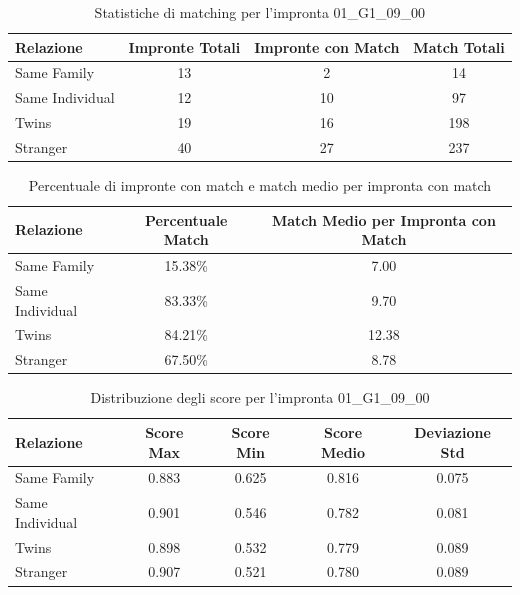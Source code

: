 \begin{table}[htbp]
\centering
\caption{Statistiche di matching per l'impronta 01\_G1\_09\_00}
\label{tab:results_01_G1_09_00}
\begin{tabular}{|l|c|c|c|}
\hline
\textbf{Relazione} & \textbf{Impronte Totali} & \textbf{Impronte con Match} & \textbf{Match Totali} \\
\hline
Same Family & 13 & 2 & 14 \\
\hline
Same Individual & 12 & 10 & 97 \\
\hline
Twins & 19 & 16 & 198 \\
\hline
Stranger & 40 & 27 & 237 \\
\hline
\end{tabular}
\end{table}


\begin{table}[htbp]
\centering
\caption{Percentuale di impronte con match e match medio per impronta con match}
\label{tab:match_percentage_01_G1_09_00}
\begin{tabular}{|l|c|c|}
\hline
\textbf{Relazione} & \textbf{Percentuale Match} & \textbf{Match Medio per Impronta con Match} \\
\hline
Same Family & 15.38\% & 7.00 \\
\hline
Same Individual & 83.33\% & 9.70 \\
\hline
Twins & 84.21\% & 12.38 \\
\hline
Stranger & 67.50\% & 8.78 \\
\hline
\end{tabular}
\end{table}


\begin{table}[htbp]
\centering
\caption{Distribuzione degli score per l'impronta 01\_G1\_09\_00}
\label{tab:scores_01_G1_09_00}
\begin{tabular}{|l|c|c|c|c|}
\hline
\textbf{Relazione} & \textbf{Score Max} & \textbf{Score Min} & \textbf{Score Medio} & \textbf{Deviazione Std} \\
\hline
Same Family & 0.883 & 0.625 & 0.816 & 0.075 \\
\hline
Same Individual & 0.901 & 0.546 & 0.782 & 0.081 \\
\hline
Twins & 0.898 & 0.532 & 0.779 & 0.089 \\
\hline
Stranger & 0.907 & 0.521 & 0.780 & 0.089 \\
\hline
\end{tabular}
\end{table}

